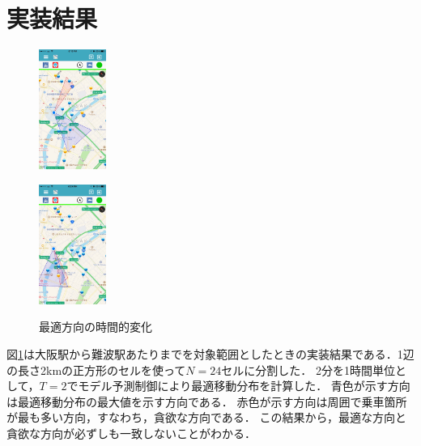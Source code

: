 \documentclass[a4j,9pt,twocolumn]{paper}
\begin{document}
\section{実装結果}
\begin{figure}[h]
  \begin{minipage}[b]{0.5\linewidth}
    \centering
    \includegraphics[keepaspectratio, width=22mm]{Graphics/201603311815.jpg}
    \label{fig:fig1-1}
  \end{minipage}
  \begin{minipage}[b]{0.5\linewidth}
    \centering
    \includegraphics[keepaspectratio, width=22mm]{Graphics/201603311824.jpg}
    \label{fig:fig1-2}
  \end{minipage}
  \caption{最適方向の時間的変化}\label{fig:fig1}
\end{figure}
図\ref{fig:fig1}は大阪駅から難波駅あたりまでを対象範囲としたときの実装結果である．1辺の長さ2kmの正方形のセルを使って$N=24$セルに分割した．
2分を1時間単位として，$T=2$でモデル予測制御により最適移動分布を計算した．
青色が示す方向は最適移動分布の最大値を示す方向である．
赤色が示す方向は周囲で乗車箇所が最も多い方向，すなわち，貪欲な方向である．
この結果から，最適な方向と貪欲な方向が必ずしも一致しないことがわかる．

%
%
\newpage
\pagebreak
\end{document}
